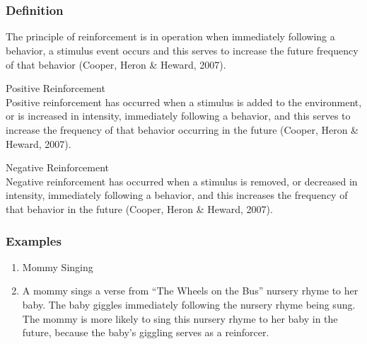 \chapter{\foursecd{}}
\clearpage \section{\fourdOne{}}
\subsection{Definition}
The principle of reinforcement is in operation when immediately following a behavior, a stimulus event occurs and this serves to increase the future frequency of that behavior (Cooper, Heron \& Heward, 2007).

Positive Reinforcement\\
Positive reinforcement has occurred when a stimulus is added to the environment, or is increased in intensity, immediately following a behavior, and this serves to increase the frequency of that behavior occurring in the future (Cooper, Heron \& Heward, 2007).

Negative Reinforcement\\
Negative reinforcement has occurred when a stimulus is removed, or decreased in intensity, immediately following a behavior, and this increases the frequency of that behavior in the future (Cooper, Heron \& Heward, 2007).
\subsection{Examples}
\begin{enumerate}
\item Mommy Singing
\item A mommy sings a verse from ``The Wheels on the Bus'' nursery rhyme to her baby. The baby giggles immediately following the nursery rhyme being sung. The mommy is more likely to sing this nursery rhyme to her baby in the future, because the baby's giggling serves as a reinforcer.
\end{enumerate}
 
